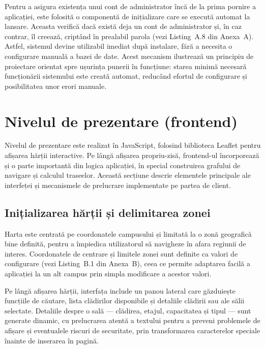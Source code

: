 Pentru a asigura existența unui cont de administrator încă de la prima
pornire a aplicației, este folosită o componentă de inițializare care se
execută automat la lansare. Aceasta verifică dacă există deja un cont de
administrator și, în caz contrar, îl creează, criptând în prealabil parola
(vezi Listing~A.8 din Anexa~A). Astfel, sistemul devine utilizabil imediat
după instalare, fără a necesita o configurare manuală a bazei de date. Acest
mecanism ilustrează un principiu de proiectare orientat spre ușurința punerii
în funcțiune: starea minimă necesară funcționării sistemului este creată
automat, reducând efortul de configurare și posibilitatea unor erori manuale.

\section{Nivelul de prezentare (frontend)}
\label{sec:frontend}

Nivelul de prezentare este realizat în JavaScript, folosind biblioteca Leaflet
\cite{Leaflet} pentru afișarea hărții interactive. Pe lângă afișarea
propriu-zisă, frontend-ul încorporează și o parte importantă din logica
aplicației, în special construirea grafului de navigare și calculul
traseelor. Această secțiune descrie elementele principale ale interfeței și
mecanismele de prelucrare implementate pe partea de client.

\subsection{Inițializarea hărții și delimitarea zonei}
\label{subsec:init-harta}

Harta este centrată pe coordonatele campusului și limitată la o zonă
geografică bine definită, pentru a împiedica utilizatorul să navigheze în
afara regiunii de interes. Coordonatele de centrare și limitele zonei sunt
definite ca valori de configurare (vezi Listing~B.1 din Anexa~B), ceea ce
permite adaptarea facilă a aplicației la un alt campus prin simpla
modificare a acestor valori.

Pe lângă afișarea hărții, interfața include un panou lateral care găzduiește
funcțiile de căutare, lista clădirilor disponibile și detaliile clădirii sau
ale sălii selectate. Detaliile despre o sală — clădirea, etajul, capacitatea
și tipul — sunt generate dinamic, cu prelucrarea atentă a textului pentru a
preveni problemele de afișare și eventualele riscuri de securitate, prin
transformarea caracterelor speciale înainte de inserarea în pagină.

